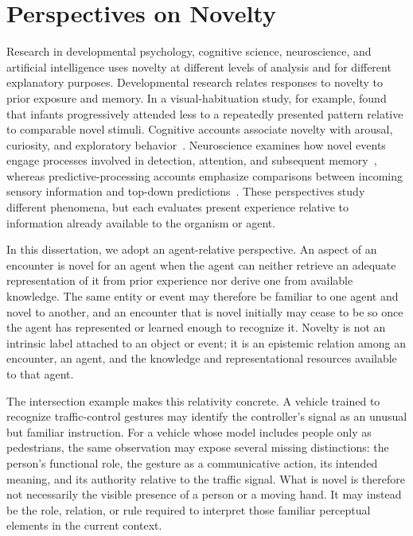 \section{Perspectives on Novelty}
\label{sec:novelty_as_mismatch}
\label{sec:novelty_perspectives}

Research in developmental psychology, cognitive science, neuroscience, and artificial intelligence uses novelty at different levels of analysis and for different explanatory purposes.
Developmental research relates responses to novelty to prior exposure and memory.
In a visual-habituation study, for example, \citet{fantz1964visual} found that infants progressively attended less to a repeatedly presented pattern relative to comparable novel stimuli.
Cognitive accounts associate novelty with arousal, curiosity, and exploratory behavior~\citep{berlyne1960conflict}.
Neuroscience examines how novel events engage processes involved in detection, attention, and subsequent memory~\citep{ranganath2003neural}, whereas predictive-processing accounts emphasize comparisons between incoming sensory information and top-down predictions~\citep{clark2013predictive,friston2010free}.
These perspectives study different phenomena, but each evaluates present experience relative to information already available to the organism or agent.

In this dissertation, we adopt an agent-relative perspective.
An aspect of an encounter is novel for an agent when the agent can neither retrieve an adequate representation of it from prior experience nor derive one from available knowledge.
The same entity or event may therefore be familiar to one agent and novel to another, and an encounter that is novel initially may cease to be so once the agent has represented or learned enough to recognize it.
Novelty is not an intrinsic label attached to an object or event; it is an epistemic relation among an encounter, an agent, and the knowledge and representational resources available to that agent.

The intersection example makes this relativity concrete.
A vehicle trained to recognize traffic-control gestures may identify the controller's signal as an unusual but familiar instruction.
For a vehicle whose model includes people only as pedestrians, the same observation may expose several missing distinctions: the person's functional role, the gesture as a communicative action, its intended meaning, and its authority relative to the traffic signal.
What is novel is therefore not necessarily the visible presence of a person or a moving hand.
It may instead be the role, relation, or rule required to interpret those familiar perceptual elements in the current context.

